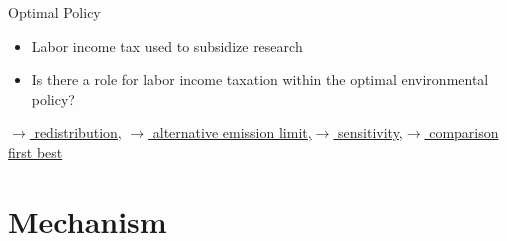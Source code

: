 \documentclass[11pt,aspectratio=169]{beamer}
\begin{document}
\begin{frame}{Optimal Policy}
\begin{figure}[h!!]
\begin{subfigure}{0.45\textwidth}
		\end{subfigure}
	\end{figure}
	\vspace{3mm}
	\pause
	\begin{block}{}
		\begin{itemize}
			\item Labor income tax used to subsidize research
			\item Is there a role for labor income taxation within the optimal environmental policy?
		\end{itemize}
	\end{block}	
	\hypertarget{backOPT}{}
	\vspace{-5.7mm}
	\hfill \hyperlink{Redis}{\tiny{$\rightarrow$ redistribution,}}
	\hyperlink{altems}{\tiny{$\rightarrow$ alternative emission limit,}}\hyperlink{sensphi}{\tiny{$\rightarrow$ sensitivity,}}\hyperlink{compfb}{\tiny{$\rightarrow$ comparison first best}}
\end{frame}


\section*{Mechanism}
\end{document}
